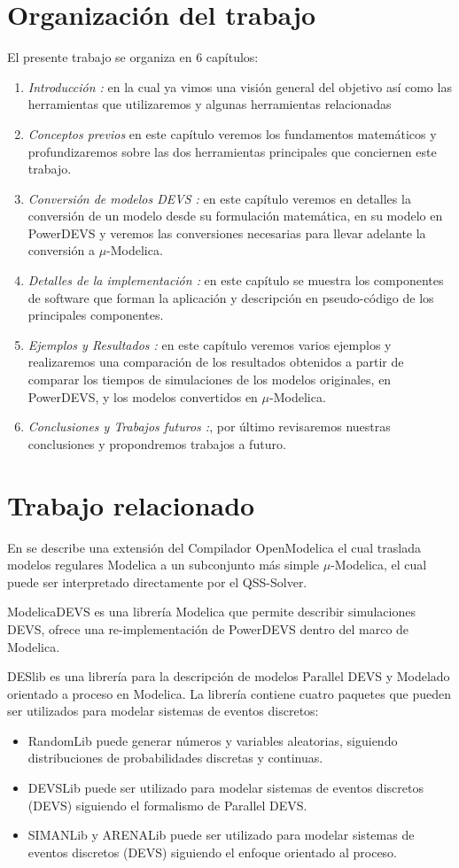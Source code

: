 \section{Organización del trabajo}
El presente trabajo se organiza en 6 capítulos:
\begin{enumerate}
\item \emph{Introducción :} en la cual ya vimos una visión general del objetivo así como las herramientas que utilizaremos y algunas herramientas relacionadas
\item \emph{Conceptos previos} en este capítulo veremos los fundamentos matemáticos y profundizaremos sobre las dos herramientas principales que conciernen este trabajo.
\item \emph{Conversión de modelos DEVS :} en este capítulo veremos en detalles la conversión de un modelo desde su formulación matemática, en su modelo en PowerDEVS y veremos las conversiones necesarias para llevar adelante la conversión a $\mu$-Modelica.
\item \emph{Detalles de la implementación :} en este capítulo se muestra los componentes de software que forman la aplicación y descripción en pseudo-código de los principales componentes.
\item \emph{Ejemplos y Resultados :} en este capítulo veremos varios ejemplos y realizaremos una comparación de los resultados obtenidos a partir de comparar los tiempos de simulaciones de los modelos originales, en PowerDEVS, y los modelos convertidos en $\mu$-Modelica.
\item \emph{Conclusiones y Trabajos futuros :}, por último revisaremos nuestras conclusiones y propondremos trabajos a futuro.
\end{enumerate}

\section{Trabajo relacionado}
En \cite{Ber12} se describe una extensión del Compilador OpenModelica el cual traslada modelos regulares Modelica a un subconjunto más simple $\mu$-Modelica, el cual puede ser interpretado directamente por el QSS-Solver.


ModelicaDEVS \cite{Beltrame06quantisedstate} es una librería Modelica que permite describir simulaciones DEVS, ofrece una re-implementación de PowerDEVS dentro del marco de Modelica.

DESlib \cite{Sanz09paralleldevs} es una librería para la descripción de modelos Parallel DEVS y Modelado orientado a proceso en Modelica.
La librería contiene cuatro paquetes que pueden ser utilizados para modelar sistemas de eventos discretos:
\begin{itemize}
\item RandomLib puede generar números y variables aleatorias, siguiendo distribuciones de probabilidades discretas y continuas.
\item DEVSLib puede ser utilizado para modelar sistemas de eventos discretos (DEVS) siguiendo el formalismo de Parallel DEVS.
\item SIMANLib y ARENALib puede ser utilizado para modelar sistemas de eventos discretos (DEVS) siguiendo el enfoque orientado al proceso.
\end{itemize}

